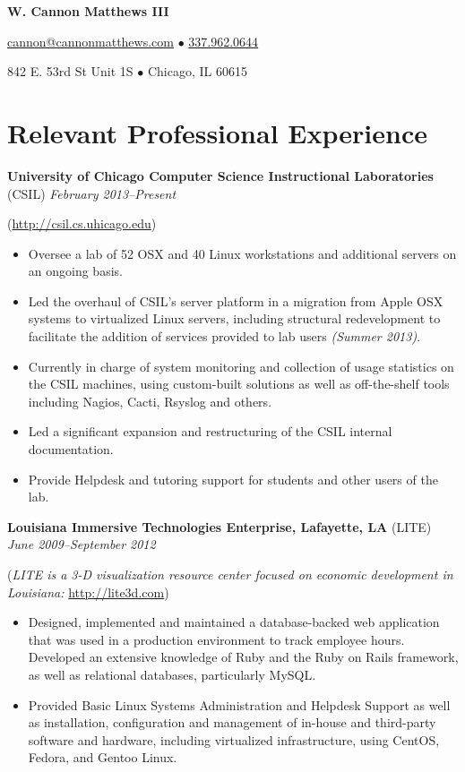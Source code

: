 \documentclass[10pt,letterpaper]{article} %
\begin{document}
 
    \centerline{\LARGE \bf W. Cannon Matthews III} 
    \centerline{ \href{mailto:cannon@cannonmatthews.com}{cannon@cannonmatthews.com} $\bullet$ \href{tel:13379620644}{337.962.0644 }}
    \centerline{842 E. 53rd St Unit 1S $\bullet$ Chicago, IL 60615 }
    \hrulefill
%
    \section*{Relevant Professional Experience} 
        \textbf{University of Chicago Computer Science Instructional Laboratories} (CSIL) \hfill \textit{February 2013--Present }
            \begin{footnotesize}
                (\url{http://csil.cs.uhicago.edu})
            \end{footnotesize}
            \begin{itemize}
            \item Oversee a lab of 52 OSX and 40 Linux workstations and additional servers on an ongoing basis.
            \item Led the overhaul of CSIL's server platform in a migration from Apple OSX systems to virtualized Linux servers, including structural redevelopment to facilitate the addition of services provided to lab users \textit{(Summer 2013)}. 
            \item Currently in charge of system monitoring and collection of usage statistics on the CSIL machines, using custom-built solutions as well as off-the-shelf tools including Nagios, Cacti, Rsyslog and others. 
	    \item Led a significant expansion and restructuring of the CSIL internal documentation.
            \item Provide Helpdesk and tutoring support for students and other users of the lab. 
            \end{itemize}
            \vspace{1em}
        \textbf{Louisiana Immersive Technologies Enterprise, Lafayette, LA} (LITE) \hfill \textit{June 2009--September 2012} 

            \begin{footnotesize}
                (\textit{LITE is a 3-D visualization resource center focused on economic development in Louisiana: }\url{http://lite3d.com})
            \end{footnotesize}
            \begin{itemize} 
            \item  Designed, implemented and maintained a database-backed web application that was used in a production environment to track 
                   employee hours. Developed an extensive knowledge of Ruby and the 
                   Ruby on Rails framework, as well as relational databases, particularly MySQL.
            \item  Provided Basic Linux Systems Administration and Helpdesk Support as well as installation, configuration and 
                   management of in-house and third-party software and hardware, including virtualized infrastructure, using CentOS, Fedora, and Gentoo Linux.
            \end{itemize} 
\end{document}
